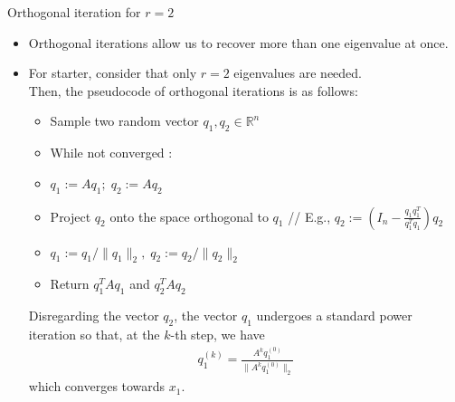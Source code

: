 \documentclass[t,usepdftitle=false]{beamer}
\begin{document}
\begin{frame}{Orthogonal iteration for $r=2$}
\begin{itemize}
\item Orthogonal iterations allow us to recover more than one eigenvalue at once.
\item For starter, consider that only $r=2$ eigenvalues are needed.\vspace{.1cm}\\
Then, the pseudocode of orthogonal iterations is as follows:\vspace{.2cm}
\begin{itemize}
\item[1.] Sample two random vector $q_1,q_2\in\mathbb{R}^n$\vspace{.07cm}
\item[2.] While not converged :\vspace{.07cm}
\item[5.]\hspace{.4cm}$q_1:=Aq_1;\;q_2:=Aq_2$\vspace{.07cm}
\item[6.]\hspace{.4cm}Project $q_2$ onto the space orthogonal to $q_1$ {\color{gray}// E.g., $q_2:=\left(I_n-\frac{q_1q_1^T}{q_1^Tq_1}\right)q_2$}\vspace{.07cm}
\item[7.]\hspace{.4cm}$q_1:=q_1/\|q_1\|_2,\;q_2:=q_2/\|q_2\|_2$\vspace{.07cm}
\item[8.] Return $q_1^TAq_1$ and $q_2^TAq_2$\vspace{.2cm}
\end{itemize}
Disregarding the vector $q_2$, the vector $q_1$ undergoes a standard power iteration so that, at the $k$-th step, we have
\begin{align*}
q_1^{(k)}=\frac{A^kq_1^{(0)}}{\|A^kq_1^{(0)}\|_2}
\end{align*}
which converges towards $x_1$.
\end{itemize}
\end{frame}
\end{document}
